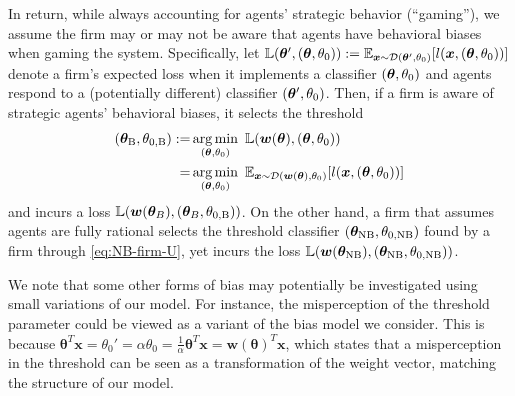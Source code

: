In return, while always accounting for agents' strategic behavior (``gaming''), we assume the firm may or may not be aware that agents have behavioral biases when gaming the system. Specifically, let ${\mathbb{L}}({\bm{\theta}}', ({\bm{\theta}}, \theta_{0})):= \mathbb{E}_{{\bm{x}}\sim\mathcal{D}({\bm{\theta}}', \theta_{0})}[l({\bm{x}}, ({\bm{\theta}}, \theta_{0}))]$ denote a firm's expected loss when it implements a classifier $({\bm{\theta}}, \theta_{0})$ and agents respond to a (potentially different) classifier $({\bm{\theta}}', \theta_{0})$. Then, if a firm is aware of strategic agents' behavioral biases, it selects the threshold 
\begin{align}({\bm{\theta}}_\text{B}, \theta_{0, \text{B}}) := & \operatorname*{arg\,min}_{({\bm{\theta}}, \theta_0)} ~ {\mathbb{L}}({\bm{w}}({\bm{\theta}}), ({\bm{\theta}}, \theta_0))\notag\\
= &\operatorname*{arg\,min}_{({\bm{\theta}}, \theta_0)} ~ \mathbb{E}_{{\bm{x}}\sim\mathcal{D}({\bm{w}}({\bm{\theta}}), \theta_{0})}[l({\bm{x}}, ({\bm{\theta}}, \theta_{0}))]
\label{eq:B-firm-U}
\end{align}
and incurs a loss ${\mathbb{L}}({\bm{w}}({\bm{\theta}}_{B}), ({\bm{\theta}}_{B}, \theta_{0, \text{B}}))$. On the other hand, a firm that assumes agents are fully rational selects the threshold classifier $({\bm{\theta}}_\text{NB}, \theta_{0, \text{NB}})$ found by a firm through \eqref{eq:NB-firm-U}, yet incurs the loss ${\mathbb{L}}({\bm{w}}({\bm{\theta}}_\text{NB}), ({\bm{\theta}}_\text{NB}, \theta_{0, \text{NB}}))$. 

{We note that some other forms of bias may potentially be investigated using small variations of our model. For instance, the misperception of the threshold parameter could be viewed as a variant of the bias model we consider. This is because $\boldsymbol{\theta}^T \boldsymbol{x} = \theta_0' = \alpha \theta_0 = \frac{1}{\alpha}\boldsymbol{\theta}^T \boldsymbol{x} = \boldsymbol{w}(\boldsymbol{\theta})^T\boldsymbol{x}$, which states that a misperception in the threshold can be seen as a transformation of the weight vector, matching the structure of our model.} 
